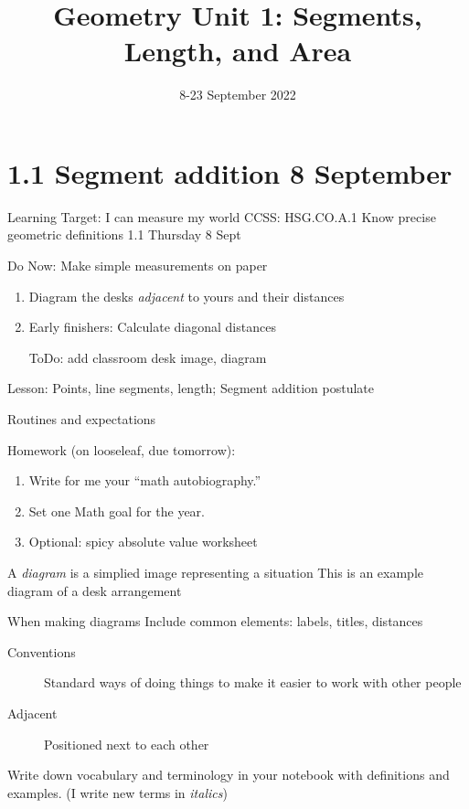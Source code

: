 

\title{Geometry Unit 1: Segments, Length, and Area}
\date{8-23 September 2022}


\frame{\titlepage}

\section[Outline]{}
\frame{\tableofcontents}

\section{1.1 Segment addition \hfill 8 September}
\begin{frame}{Learning Target: I can measure my world}
  {CCSS: HSG.CO.A.1 Know precise geometric definitions \hfill \alert{1.1 Thursday 8 Sept}}
  \begin{block}{Do Now: Make simple measurements on paper}
    \begin{enumerate}
        \item Diagram the desks \emph{adjacent} to yours and their distances
        \item Early finishers: Calculate diagonal distances
        \item [ToDo:] add classroom desk image, diagram
    \end{enumerate}
    \end{block}
    Lesson: Points, line segments, length; Segment addition postulate \par 
    Routines and expectations \par \medskip
    Homework (on looseleaf, due tomorrow): 
    \begin{enumerate}
      \item Write for me your ``math autobiography.''
      \item Set one Math goal for the year.
      \item Optional: spicy absolute value worksheet
    \end{enumerate}
     \par \medskip
    
  \end{frame}

\begin{frame}{A \emph{diagram} is a simplied image representing a situation}
  {This is an example diagram of a desk arrangement}
  \begin{block}{When making diagrams}
    Include common elements: labels, titles, distances \par \medskip
  \end{block}
  \begin{description}
    \item[Conventions] Standard ways of doing things to make it easier to work with other people
    \item[Adjacent] Positioned next to each other
  \end{description} \vspace{2cm}
  Write down vocabulary and terminology in your notebook with definitions and examples. (I write new terms in \emph{italics})
  \end{frame}

